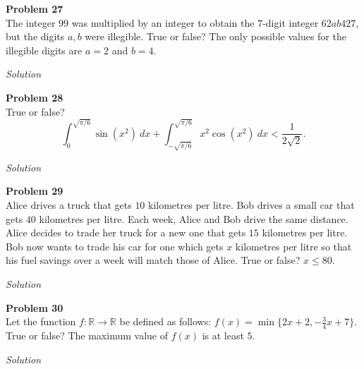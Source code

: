 \documentclass{amsart}
\begin{document}
\textbf{Problem 27}\\
The integer $99$ was multiplied by an integer to obtain the $7$-digit integer $62ab427$, but the digits $a,b$ were illegible.
True or false? The only possible values for the illegible digits are $a = 2$ and $b = 4$.

\textit{Solution}

\textbf{Problem 28}\\
True or false?
\[ \int_0^{\sqrt{\pi/6}} \sin(x^2) \ dx + \int_{-\sqrt{\pi/6}}^{\sqrt{\pi/6}} x^2 \cos(x^2) \ dx < \frac{1}{2\sqrt{2}}. \]

\textit{Solution}

\textbf{Problem 29}\\
Alice drives a truck that gets $10$ kilometres per litre.
Bob drives a small car that gets $40$ kilometres per litre.
Each week, Alice and Bob drive the same distance.
Alice decides to trade her truck for a new one that gets $15$ kilometres per litre.
Bob now wants to trade his car for one which gets $x$ kilometres per litre so that his fuel savings over a week will match those of Alice.
True or false? $x \leq 80$.

\textit{Solution}

\textbf{Problem 30}\\
Let the function $f : \mathbb{R} \to \mathbb{R}$ be defined as follows: $f(x) = \min\{2x + 2,-\frac{3}{4}x + 7\}$.
True or false? The maximum value of $f(x)$ is at least $5$.

\textit{Solution}
\end{document}
